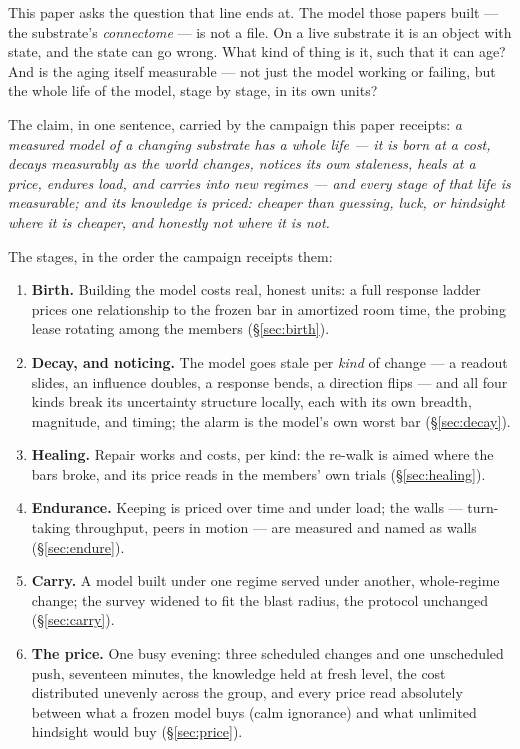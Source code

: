 \documentclass[11pt,a4paper]{article}
\begin{document}
This paper asks the question that line ends at. The model those papers
built --- the substrate's \emph{connectome} --- is not a file. On a
live substrate it is an object with state, and the state can go wrong.
What kind of thing is it, such that it can age? And is the aging
itself measurable --- not just the model working or failing, but the
whole life of the model, stage by stage, in its own units?

The claim, in one sentence, carried by the campaign this paper
receipts: \emph{a measured model of a changing substrate has a whole
life --- it is born at a cost, decays measurably as the world changes,
notices its own staleness, heals at a price, endures load, and carries
into new regimes --- and every stage of that life is measurable; and
its knowledge is priced: cheaper than guessing, luck, or hindsight
where it is cheaper, and honestly not where it is not.}

The stages, in the order the campaign receipts them:

\begin{enumerate}
\item \textbf{Birth.} Building the model costs real, honest units: a
full response ladder prices one relationship to the frozen bar in
amortized room time, the probing lease rotating among the members
(\S\ref{sec:birth}).
\item \textbf{Decay, and noticing.} The model goes stale per
\emph{kind} of change --- a readout slides, an influence doubles, a
response bends, a direction flips --- and all four kinds break its
uncertainty structure locally, each with its own breadth, magnitude,
and timing; the alarm is the model's own worst bar
(\S\ref{sec:decay}).
\item \textbf{Healing.} Repair works and costs, per kind: the re-walk
is aimed where the bars broke, and its price reads in the members' own
trials (\S\ref{sec:healing}).
\item \textbf{Endurance.} Keeping is priced over time and under load;
the walls --- turn-taking throughput, peers in motion --- are measured
and named as walls (\S\ref{sec:endure}).
\item \textbf{Carry.} A model built under one regime served under
another, whole-regime change; the survey widened to fit the blast
radius, the protocol unchanged (\S\ref{sec:carry}).
\item \textbf{The price.} One busy evening: three scheduled changes
and one unscheduled push, seventeen minutes, the knowledge held at
fresh level, the cost distributed unevenly across the group, and every
price read absolutely between what a frozen model buys (calm
ignorance) and what unlimited hindsight would buy
(\S\ref{sec:price}).
\end{enumerate}
\end{document}
